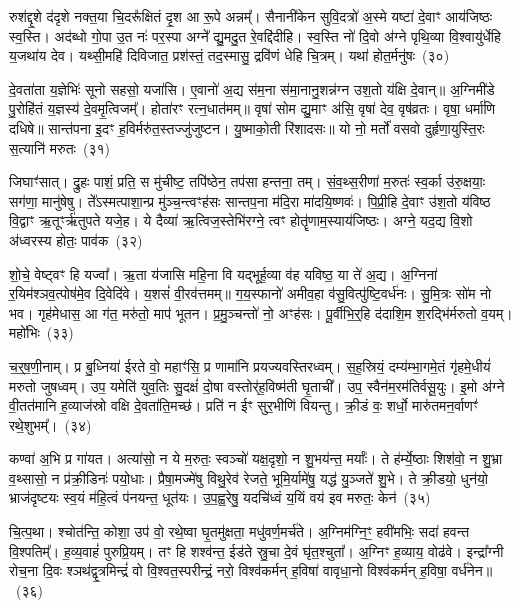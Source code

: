 रुश॑द्दृ॒शे द॑दृशे नक्त॒या चि॒दरू᳚क्षितं दृ॒श आ रू॒पे अन्नम्᳚। सैनानी॑केन सुवि॒दत्रो॑ अ॒स्मे यष्टा॑ दे॒वाꣳ आय॑जिष्ठः स्व॒स्ति। अद॑ब्धो गो॒पा उ॒त नः॑ पर॒स्पा अग्ने᳚ द्यु॒मदु॒त रे॒वद्दि॑दीहि। स्व॒स्ति नो॑ दि॒वो अ॑ग्ने पृथि॒व्या वि॒श्वायु॑र्धेहि य॒जथा॑य देव। यथ्सी॒महि॑ दिविजात॒ प्रश॑स्तं॒ तद॒स्मासु॒ द्रवि॑णं धेहि चि॒त्रम्। यथा॑ होत॒र्मनु॑षः~(३०)

दे॒वता॑ता य॒ज्ञेभिः॑ सूनो सहसो॒ यजा॑सि। ए॒वानो॑ अ॒द्य स॑म॒ना स॑मा॒नानु॒शन्न॑ग्न उश॒तो य॑क्षि दे॒वान्॥ अ॒ग्निमी॑डे पु॒रोहि॑तं य॒ज्ञस्य॑ दे॒वमृ॒त्विजम्᳚। होता॑रꣳ रत्न॒धात॑मम्॥ वृषा॑ सोम द्यु॒माꣳ अ॑सि॒ वृषा॑ देव॒ वृष॑व्रतः। वृषा॒ धर्मा॑णि दधिषे॥ सान्त॑पना इ॒दꣳ ह॒विर्मरु॑त॒स्तज्जु॑जुष्टन। यु॒ष्माको॒ती रि॑शादसः॥ यो नो॒ मर्तो॑ वसवो दुर्\mbox{}हृणा॒युस्ति॒रः स॒त्यानि॑ मरुतः~(३१)

जिघाꣳ॑सात्। द्रु॒हः पाशं॒ प्रति॒ स मु॑चीष्ट॒ तपि॑ष्ठेन॒ तप॑सा हन्तना॒ तम्। सं॒व॒थ्स॒रीणा॑ म॒रुतः॑ स्व॒र्का उ॑रु॒क्षयाः॒ सग॑णा॒ मानु॑षेषु। ते᳚\-ऽस्मत्पाशा॒न्प्र मु॑ञ्च॒न्त्वꣳह॑सः सान्तप॒ना म॑दि॒रा मा॑दयि॒ष्णवः॑। पि॒प्री॒हि दे॒वाꣳ उ॑श॒तो य॑विष्ठ वि॒द्वाꣳ ऋ॒तूꣳर्\mbox{}ऋ॑तुपते यजे॒ह। ये दैव्या॑ ऋ॒त्विज॒स्तेभि॑रग्ने॒ त्वꣳ होतॄ॑णाम॒स्याय॑जिष्ठः। अग्ने॒ यद॒द्य वि॒शो अ॑ध्वरस्य होतः॒ पाव॑क~(३२)

शो॒चे॒ वेष्ट्वꣳ हि यज्वा᳚। ऋ॒ता य॑जासि महि॒ना वि यद्भूर्\mbox{}ह॒व्या व॑ह यविष्ठ॒ या ते॑ अ॒द्य। अ॒ग्निना॑ र॒यिम॑श्ञव॒त्पोष॑मे॒व दि॒वेदि॑वे। य॒शसं॑ वी॒रव॑त्तमम्॥ ग॒य॒स्फानो॑ अमीव॒हा व॑सु॒वित्पु॑ष्टि॒वर्ध॑नः। सु॒मि॒त्रः सो॑म नो भव। गृह॑मेधास॒ आ ग॑त॒ मरु॑तो॒ माप॑ भूतन। प्र॒मु॒ञ्चन्तो॑ नो॒ अꣳह॑सः। पू॒र्वीभि॒र्॒\mbox{}हि द॑दाशि॒म श॒रद्भि॑र्मरुतो व॒यम्। महो॑भिः~(३३)

च॒र्॒\mbox{}ष॒णी॒नाम्। प्र बु॒ध्निया॑ ईरते वो॒ महाꣳ॑सि॒ प्र णामा॑नि प्रयज्यवस्तिरध्वम्। स॒ह॒स्रियं॒ दम्य॑म्भा॒गमे॒तं गृ॑हमे॒धीयं॑ मरुतो जुषध्वम्। उप॒ यमेति॑ युव॒तिः सु॒दक्षं॑ दो॒षा वस्तोर्॑\mbox{}ह॒विष्म॑ती घृ॒ताची᳚। उप॒ स्वैन॑म॒रम॑तिर्वसू॒युः। इ॒मो अ॑ग्ने वी॒तत॑मानि ह॒व्याज॑स्रो वक्षि दे॒वता॑ति॒मच्छ॑। प्रति॑ न ईꣳ सुर॒भीणि॑ वियन्तु। क्री॒डं वः॒ शर्धो॒ मारु॑तमन॒र्वाणꣳ॑ रथे॒शुभम्᳚।~(३४)

कण्वा॑ अ॒भि प्र गा॑यत। अत्या॑सो॒ न ये म॒रुतः॒ स्वञ्चो॑ यक्ष॒दृशो॒ न शु॒भय॑न्त॒ मर्याः᳚। ते ह॑र्म्ये॒ष्ठाः शिश॑वो॒ न शु॒भ्रा व॒थ्सासो॒ न प्र॑क्री॒डिनः॑ पयो॒धाः। प्रैषा॒मज्मे॑षु विथु॒रेव॑ रेजते॒ भूमि॒र्यामे॑षु॒ यद्ध॑ यु॒ञ्जते॑ शु॒भे। ते क्री॒डयो॒ धुन॑यो॒ भ्राज॑दृष्टयः स्व॒यं म॑हि॒त्वं प॑नयन्त॒ धूत॑यः। उ॒प॒ह्व॒रेषु॒ यदचि॑ध्वं य॒यिं वय॑ इव मरुतः॒ केन॑~(३५)

चि॒त्प॒था। श्चोत॑न्ति॒ कोशा॒ उप॑ वो॒ रथे॒ष्वा घृ॒तमु॑क्षता॒ मधु॑वर्ण॒मर्च॑ते। अ॒ग्निम॑ग्नि॒ꣳ॒ हवी॑मभिः॒ सदा॑ हवन्त वि॒श्पतिम्᳚। ह॒व्य॒वाहं॑ पुरुप्रि॒यम्। तꣳ हि शश्व॑न्त॒ ईड॑ते स्रु॒चा दे॒वं घृ॑त॒श्चुता᳚। अ॒ग्निꣳ ह॒व्याय॒ वोढ॑वे। इन्द्रा᳚ग्नी रोच॒ना दि॒वः श्ञथ॑द्वृ॒त्रमिन्द्रं॑ वो वि॒श्वत॒स्परीन्द्रं॒ नरो॒ विश्व॑कर्मन् ह॒विषा॑ वावृधा॒नो विश्व॑कर्मन् ह॒विषा॒ वर्ध॑नेन॥~(३६)

